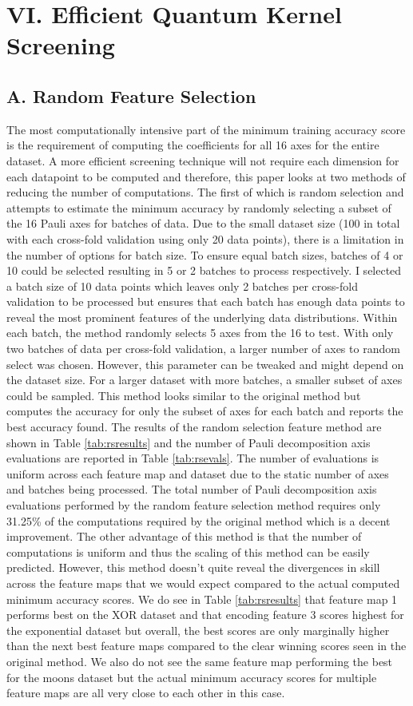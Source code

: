 \documentclass[
	a4paper, %
	10pt, %
	unnumberedsections, %
	twoside, %
]{LTJournalArticle}
\begin{document}
\section{VI. Efficient Quantum Kernel Screening}
\subsection{A. Random Feature Selection}
The most computationally intensive part of the minimum training accuracy score is the requirement of computing the coefficients for all 16 axes for the entire dataset. A more efficient screening 
technique will not require each dimension for each datapoint to be computed and therefore, this paper looks at two methods of reducing the number of computations. The first of which is random 
selection and attempts to estimate the minimum accuracy by randomly selecting a subset of the 16 Pauli axes for batches of data. Due to the small dataset size (100 in total with each cross-fold 
validation using only 20 data points), there is a limitation in the number of options for batch size. To ensure equal batch sizes, batches of 4 or 10 could be selected resulting in 5 or 2 batches 
to process respectively. I selected a batch size of 10 data points which leaves only 2 batches per cross-fold validation to be processed but ensures that each batch has enough data points to 
reveal the most prominent features of the underlying data distributions. Within each batch, the method randomly selects 5 axes from the 16 to test. With only two batches of data per cross-fold 
validation, a larger number of axes to random select was chosen. However, this parameter can be tweaked and might depend on the dataset size. For a larger dataset with more batches, a smaller 
subset of axes could be sampled. This method looks similar to the original method but computes the accuracy for only the subset of axes for each batch and reports the best accuracy found. The 
results of the random selection feature method are shown in Table \ref{tab:rsresults} and the number of Pauli decomposition axis evaluations are reported in Table \ref{tab:rsevals}. The number of evaluations is uniform across 
each feature map and dataset due to the static number of axes and batches being processed. The total number of Pauli decomposition axis evaluations performed by the random feature selection 
method requires only 31.25\% of the computations required by the original method which is a decent improvement. The other advantage of this method is that the number of computations is uniform 
and thus the scaling of this method can be easily predicted. However, this method doesn't quite reveal the divergences in skill across the feature maps that we would expect compared to the actual 
computed minimum accuracy scores. We do see in Table \ref{tab:rsresults} that feature map 1 performs best on the XOR dataset and that encoding feature 3 scores highest for the exponential dataset 
but overall, the best scores are only marginally higher than the next best feature maps compared to the clear winning scores seen in the original method. We also do not see the same feature map 
performing the best for the moons dataset but the actual minimum accuracy scores for multiple feature maps are all very close to each other in this case.
\end{document}
